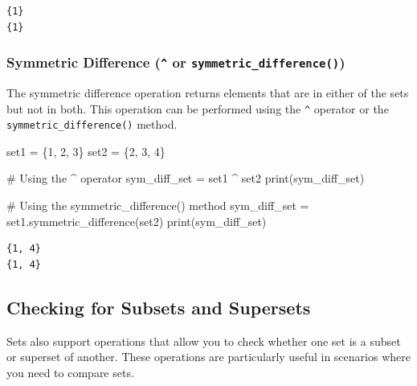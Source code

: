 \documentclass[
  letterpaper,
  DIV=11,
  numbers=noendperiod]{scrreprt}
\newenvironment{Shaded}{\begin{snugshade}}{\end{snugshade}}
\newcommand{\BuiltInTok}[1]{\textcolor[rgb]{0.00,0.23,0.31}{#1}}
\newcommand{\CommentTok}[1]{\textcolor[rgb]{0.37,0.37,0.37}{#1}}
\newcommand{\DecValTok}[1]{\textcolor[rgb]{0.68,0.00,0.00}{#1}}
\newcommand{\NormalTok}[1]{\textcolor[rgb]{0.00,0.23,0.31}{#1}}
\newcommand{\OperatorTok}[1]{\textcolor[rgb]{0.37,0.37,0.37}{#1}}
\begin{document}
\begin{verbatim}
{1}
{1}
\end{verbatim}

\hypertarget{symmetric-difference-or-symmetric_difference}{%
\subsubsection{\texorpdfstring{Symmetric Difference (\texttt{\^{}} or
\texttt{symmetric\_difference()})}{Symmetric Difference (\^{} or symmetric\_difference())}}\label{symmetric-difference-or-symmetric_difference}}

The symmetric difference operation returns elements that are in either
of the sets but not in both. This operation can be performed using the
\texttt{\^{}} operator or the \texttt{symmetric\_difference()} method.

\begin{Shaded}
\begin{Highlighting}[]
\NormalTok{set1 }\OperatorTok{=}\NormalTok{ \{}\DecValTok{1}\NormalTok{, }\DecValTok{2}\NormalTok{, }\DecValTok{3}\NormalTok{\}}
\NormalTok{set2 }\OperatorTok{=}\NormalTok{ \{}\DecValTok{2}\NormalTok{, }\DecValTok{3}\NormalTok{, }\DecValTok{4}\NormalTok{\}}

\CommentTok{\# Using the \^{} operator}
\NormalTok{sym\_diff\_set }\OperatorTok{=}\NormalTok{ set1 }\OperatorTok{\^{}}\NormalTok{ set2}
\BuiltInTok{print}\NormalTok{(sym\_diff\_set)  }

\CommentTok{\# Using the symmetric\_difference() method}
\NormalTok{sym\_diff\_set }\OperatorTok{=}\NormalTok{ set1.symmetric\_difference(set2)}
\BuiltInTok{print}\NormalTok{(sym\_diff\_set)  }
\end{Highlighting}
\end{Shaded}

\begin{verbatim}
{1, 4}
{1, 4}
\end{verbatim}

\hypertarget{checking-for-subsets-and-supersets}{%
\subsection{Checking for Subsets and
Supersets}\label{checking-for-subsets-and-supersets}}

Sets also support operations that allow you to check whether one set is
a subset or superset of another. These operations are particularly
useful in scenarios where you need to compare sets.
\end{document}

